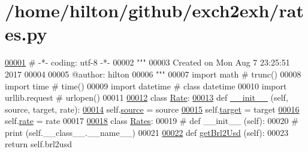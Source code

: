 \hypertarget{rates_8py_source}{}\section{/home/hilton/github/exch2exh/rates.py}

\begin{DoxyCode}
\hypertarget{rates_8py_source.tex_l00001}{}\hyperlink{namespacerates}{00001} \textcolor{comment}{# -*- coding: utf-8 -*-}
00002 \textcolor{stringliteral}{"""}
00003 \textcolor{stringliteral}{Created on Mon Aug  7 23:25:51 2017}
00004 \textcolor{stringliteral}{}
00005 \textcolor{stringliteral}{@author: hilton}
00006 \textcolor{stringliteral}{"""}
00007 \textcolor{keyword}{import} math           \textcolor{comment}{# trunc()}
00008 \textcolor{keyword}{import} time           \textcolor{comment}{# time()}
00009 \textcolor{keyword}{import} datetime       \textcolor{comment}{# class datetime}
00010 \textcolor{keyword}{import} urllib.request \textcolor{comment}{# urlopen()}
00011 
\hypertarget{rates_8py_source.tex_l00012}{}\hyperlink{classrates_1_1_rate}{00012} \textcolor{keyword}{class }\hyperlink{classrates_1_1_rate}{Rate}: 
\hypertarget{rates_8py_source.tex_l00013}{}\hyperlink{classrates_1_1_rate_a935221ad61f9c683e6da812ac7f53cc3}{00013}     \textcolor{keyword}{def }\hyperlink{classrates_1_1_rate_a935221ad61f9c683e6da812ac7f53cc3}{\_\_init\_\_} (self, source, target, rate): 
\hypertarget{rates_8py_source.tex_l00014}{}\hyperlink{classrates_1_1_rate_a82a6abb7536f2a4393f43456cfb1dc5e}{00014}         self.\hyperlink{classrates_1_1_rate_a82a6abb7536f2a4393f43456cfb1dc5e}{source} = source
\hypertarget{rates_8py_source.tex_l00015}{}\hyperlink{classrates_1_1_rate_adb1bbb0977c838106cb181a5941612c8}{00015}         self.\hyperlink{classrates_1_1_rate_adb1bbb0977c838106cb181a5941612c8}{target} = target
\hypertarget{rates_8py_source.tex_l00016}{}\hyperlink{classrates_1_1_rate_a5a660cfdfaa515a6e5809492525d61a7}{00016}         self.\hyperlink{classrates_1_1_rate_a5a660cfdfaa515a6e5809492525d61a7}{rate}   = rate        
00017         
\hypertarget{rates_8py_source.tex_l00018}{}\hyperlink{classrates_1_1_rates}{00018} \textcolor{keyword}{class }\hyperlink{classrates_1_1_rates}{Rates}:
00019 \textcolor{comment}{#    def \_\_init\_\_ (self):}
00020 \textcolor{comment}{#        print (self.\_\_class\_\_.\_\_name\_\_)}
00021     
\hypertarget{rates_8py_source.tex_l00022}{}\hyperlink{namespacerates_a083f2cdcd71554d301bcbfb0779ffa49}{00022}     \textcolor{keyword}{def }\hyperlink{namespacerates_a083f2cdcd71554d301bcbfb0779ffa49}{getBrl2Usd} (self):
00023         \textcolor{keywordflow}{return} self.brl2usd

\end{DoxyCode}
